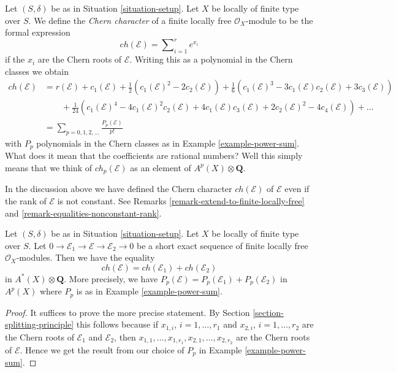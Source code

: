 \noindent
Let $(S, \delta)$ be as in Situation \ref{situation-setup}.
Let $X$ be locally of finite type over $S$.
We define the {\it Chern character} of a finite locally free
$\mathcal{O}_X$-module to be the formal expression
$$
ch({\mathcal E}) = \sum\nolimits_{i=1}^r e^{x_i}
$$
if the $x_i$ are the Chern roots of ${\mathcal E}$. Writing this
as a polynomial in the Chern classes we obtain
\begin{align*}
ch(\mathcal{E})
& =
r(\mathcal{E})
+
c_1(\mathcal{E}) +
\frac{1}{2}(c_1(\mathcal{E})^2 - 2c_2(\mathcal{E}))
+
\frac{1}{6}(c_1(\mathcal{E})^3 - 3c_1(\mathcal{E})c_2(\mathcal{E}) + 3c_3(\mathcal{E})) \\
& \quad\quad +
\frac{1}{24}(c_1(\mathcal{E})^4 - 4c_1(\mathcal{E})^2c_2(\mathcal{E}) + 4c_1(\mathcal{E})c_3(\mathcal{E}) + 2c_2(\mathcal{E})^2 - 4c_4(\mathcal{E}))
+
\ldots \\
& =
\sum\nolimits_{p = 0, 1, 2, \ldots} \frac{P_p(\mathcal{E})}{p!}
\end{align*}
with $P_p$ polynomials in the Chern classes as in
Example \ref{example-power-sum}.
What does it mean that the coefficients are rational numbers?
Well this simply means that we think of
$ch_p(\mathcal{E})$ as an element of $A^p(X) \otimes \mathbf{Q}$.

\begin{remark}
\label{remark-extend-chern-character-to-finite-locally-free}
In the discussion above we have defined the Chern character
$ch(\mathcal{E})$ of $\mathcal{E}$ even if the rank of $\mathcal{E}$
is not constant. See Remarks \ref{remark-extend-to-finite-locally-free} and
\ref{remark-equalities-nonconstant-rank}.
\end{remark}

\begin{lemma}
\label{lemma-chern-character-additive}
Let $(S, \delta)$ be as in Situation \ref{situation-setup}. Let $X$ be locally
of finite type over $S$. Let
$
0 \to \mathcal{E}_1 \to \mathcal{E} \to \mathcal{E}_2 \to 0
$
be a short exact sequence of finite locally free $\mathcal{O}_X$-modules.
Then we have the equality
$$
ch(\mathcal{E}) = ch(\mathcal{E}_1) + ch(\mathcal{E}_2)
$$
in $A^*(X) \otimes \mathbf{Q}$. More precisely, we have
$P_p(\mathcal{E}) = P_p(\mathcal{E}_1) + P_p(\mathcal{E}_2)$
in $A^p(X)$ where $P_p$ is as in Example \ref{example-power-sum}.
\end{lemma}

\begin{proof}
It suffices to prove the more precise statement. By
Section \ref{section-splitting-principle}
this follows because if $x_{1, i}$, $i = 1, \ldots, r_1$
and $x_{2, i}$, $i = 1, \ldots, r_2$ are the
Chern roots of $\mathcal{E}_1$ and $\mathcal{E}_2$, then
$x_{1, 1}, \ldots, x_{1, r_1}, x_{2, 1}, \ldots, x_{2, r_2}$
are the Chern roots of $\mathcal{E}$. Hence we get the result
from our choice of $P_p$ in Example \ref{example-power-sum}.
\end{proof}


